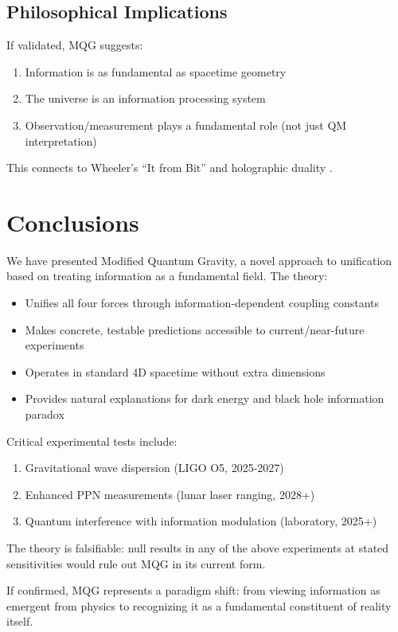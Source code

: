 \documentclass[twocolumn,prd,superscriptaddress,nofootinbib]{revtex4-2}
\begin{document}
\subsection{Philosophical Implications}

If validated, MQG suggests:
\begin{enumerate}
\item Information is as fundamental as spacetime geometry
\item The universe is an information processing system
\item Observation/measurement plays a fundamental role (not just QM interpretation)
\end{enumerate}

This connects to Wheeler's ``It from Bit'' \cite{Wheeler1990} and holographic duality \cite{Maldacena1998}.

\section{Conclusions}

We have presented Modified Quantum Gravity, a novel approach to unification based on treating information as a fundamental field. The theory:
\begin{itemize}
\item Unifies all four forces through information-dependent coupling constants
\item Makes concrete, testable predictions accessible to current/near-future experiments
\item Operates in standard 4D spacetime without extra dimensions
\item Provides natural explanations for dark energy and black hole information paradox
\end{itemize}

Critical experimental tests include:
\begin{enumerate}
\item Gravitational wave dispersion (LIGO O5, 2025-2027)
\item Enhanced PPN measurements (lunar laser ranging, 2028+)
\item Quantum interference with information modulation (laboratory, 2025+)
\end{enumerate}

The theory is falsifiable: null results in any of the above experiments at stated sensitivities would rule out MQG in its current form.

If confirmed, MQG represents a paradigm shift: from viewing information as emergent from physics to recognizing it as a fundamental constituent of reality itself.
\end{document}
